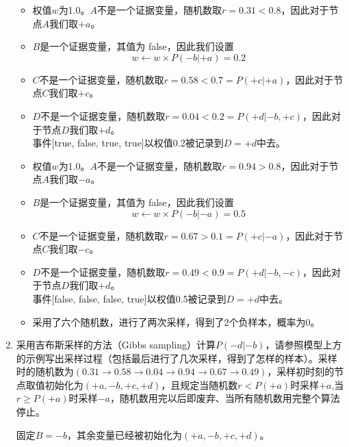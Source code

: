 \begin{enumerate}
    \begin{solution}
        \begin{itemize}
            \item 权值$w$为1.0。$A$不是一个证据变量，随机数取$r=0.31<0.8$，因此对于节点$A$我们取$+a$。
            \item $B$是一个证据变量，其值为 false，因此我们设置
            \begin{equation*}
                w\leftarrow w\times P(-b|+a) = 0.2
            \end{equation*}
            \item $C$不是一个证据变量，随机数取$r=0.58<0.7=P(+c|+a)$，因此对于节点$C$我们取$+c$。
            \item $D$不是一个证据变量，随机数取$r=0.04<0.2=P(+d| -b,+c)$，因此对于节点$D$我们取$+d$。\\
            事件[true, false, true, true]以权值0.2被记录到$D=+d$中去。
            \item 权值$w$为1.0。$A$不是一个证据变量，随机数取$r=0.94>0.8$，因此对于节点$A$我们取$-a$。
            \item $B$是一个证据变量，其值为 false，因此我们设置
            \begin{equation*}
                w\leftarrow w\times P(-b|-a) = 0.5
            \end{equation*}
            \item $C$不是一个证据变量，随机数取$r=0.67>0.1=P(+c|-a)$，因此对于节点$C$我们取$-c$。
            \item $D$不是一个证据变量，随机数取$r=0.49<0.9=P(+d| -b,-c)$，因此对于节点$D$我们取$+d$。\\
            事件[false, false, false, true]以权值0.5被记录到$D=+d$中去。
            \item 采用了六个随机数，进行了两次采样，得到了2个负样本，概率为0。
        \end{itemize}
    \end{solution}
    \item 采用吉布斯采样的方法（Gibbs sampling）计算$P(-d|-b)$，请参照模型上方的示例写出采样过程（包括最后进行了几次采样，得到了怎样的样本）。采样时的随机数为$(0.31\rightarrow 0.58\rightarrow 0.04 \rightarrow 0.94 \rightarrow 0.67 \rightarrow 0.49)$，采样初时刻的节点取值初始化为$(+a, -b, +c, +d)$，且规定当随机数$r<P(+a)$时采样$+a$,当$r\geq P(+a)$时采样$-a$，随机数用完以后即废弃、当所有随机数用完整个算法停止。
    \begin{solution}
        固定$B=-b$，其余变量已经被初始化为$(+a,-b,+c,+d)$。
        \begin{itemize}

\end{itemize}
\end{solution}
\end{enumerate}
